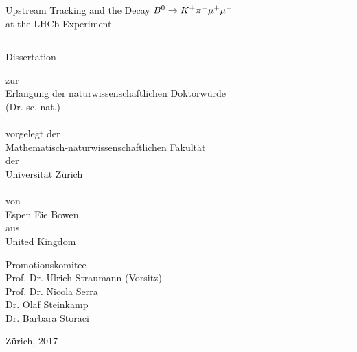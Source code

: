 \begin{titlepage}
 
\vspace*{-1.5cm}

\begin{center}
{\Large
Upstream Tracking and the Decay ${B}^{0} \rightarrow K^{+}\pi^{-}\mu^{+}\mu^{-}$\\ at the LHCb Experiment

\rule{\linewidth}{0.5pt}
}

\vspace*{1cm}

{\large
Dissertation \\
}

zur \\
Erlangung der naturwissenschaftlichen Doktorw\"urde \\ (Dr. sc. nat.) \\~\\
vorgelegt der \\ Mathematisch-naturwissenschaftlichen Fakult\"at \\
der \\
Universit\"at Z\"urich \\~\\
von \\
Espen Eie Bowen \\
aus \\
United Kingdom \\

\vspace*{1cm}

Promotionskomitee \\
Prof. Dr. Ulrich Straumann (Vorsitz) \\
Prof. Dr. Nicola Serra \\
Dr. Olaf Steinkamp \\
Dr. Barbara Storaci \\

\vspace*{1cm}

Z\"urich, 2017

\end{center}
\end{titlepage}